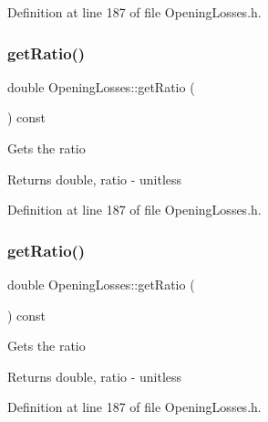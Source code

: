 Definition at line 187 of file Opening\+Losses.\+h.

\mbox{\label{class_opening_losses_ac9f7dbd2cc023932b5d8076a21a3f690}} 
\subsubsection{\texorpdfstring{get\+Ratio()}{getRatio()}\hspace{0.1cm}{\footnotesize\ttfamily [2/3]}}
{\footnotesize\ttfamily double Opening\+Losses\+::get\+Ratio (\begin{DoxyParamCaption}{ }\end{DoxyParamCaption}) const\hspace{0.3cm}{\ttfamily [inline]}}

Gets the ratio \begin{DoxyReturn}{Returns}
double, ratio -\/ unitless 
\end{DoxyReturn}


Definition at line 187 of file Opening\+Losses.\+h.

\mbox{\label{class_opening_losses_ac9f7dbd2cc023932b5d8076a21a3f690}} 
\subsubsection{\texorpdfstring{get\+Ratio()}{getRatio()}\hspace{0.1cm}{\footnotesize\ttfamily [3/3]}}
{\footnotesize\ttfamily double Opening\+Losses\+::get\+Ratio (\begin{DoxyParamCaption}{ }\end{DoxyParamCaption}) const\hspace{0.3cm}{\ttfamily [inline]}}

Gets the ratio \begin{DoxyReturn}{Returns}
double, ratio -\/ unitless 
\end{DoxyReturn}


Definition at line 187 of file Opening\+Losses.\+h.

\mbox{\label{class_opening_losses_aeefdf4431056de65ca84c6dfb24b61e1}} 
